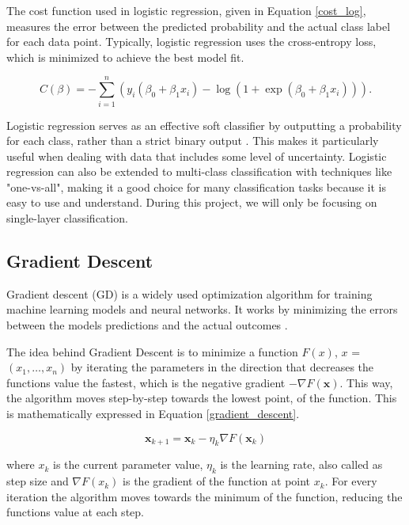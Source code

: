 \documentclass{article}
\newcommand{\0}{\mathbf{0}}
\newcommand{\1}{\mathbf{1}}
\begin{document}
The cost function used in logistic regression, given in Equation \ref{cost_log}, measures the error between the predicted probability and the actual class label for each data point. Typically, logistic regression uses the cross-entropy loss, which is minimized to achieve the best model fit.

\begin{equation}
    C(\beta) = -\sum_{i=1}^{n} \left( y_i (\beta_0 + \beta_1 x_i) - \log \left( 1 + \exp (\beta_0 + \beta_1 x_i) \right) \right).
    \label{cost_log}
\end{equation}



Logistic regression serves as an effective soft classifier by outputting a probability for each class, rather than a strict binary output \cite{uke38}. This makes it particularly useful when dealing with data that includes some level of uncertainty. Logistic regression can also be extended to multi-class classification with techniques like "one-vs-all", making it a good choice for many classification tasks because it is easy to use and understand. During this project, we will only be focusing on single-layer classification. 


 


\subsection{Gradient Descent}

Gradient descent (GD) is a widely used optimization algorithm for training machine learning models and neural networks. It works by minimizing the errors between the models predictions and the actual outcomes \cite{ibm_gradient_descent}.


The idea behind Gradient Descent is to minimize a function \(F(x)\), \(x\) = \((x_1, \dots, x_n)\) by iterating the parameters in the direction that decreases the functions value the fastest, which is the negative gradient \(-\nabla F(\mathbf{x})\). This way, the algorithm moves step-by-step towards the lowest point, of the function. This is mathematically expressed in Equation \ref{gradient_descent}. 

\begin{equation}
    \mathbf{x}_{k+1} = \mathbf{x}_k - \eta_k \nabla F(\mathbf{x}_k)
    \label{gradient_descent}
\end{equation}


where \( x_k \) is the current parameter value, \( \eta_k \) is the learning rate, also called as step size and \( \nabla F(x_k) \) is the gradient of the function at point \( x_k \). For every iteration the algorithm moves towards the minimum of the function, reducing the functions value at each step. 
\end{document}
